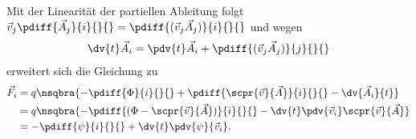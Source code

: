 \documentclass[../main.tex]{subfiles}
\begin{document}
			Mit der Linearität der partiellen Ableitung folgt $\vec v_j\pdiff{\vec{A}_j}{i}{}{}=\pdiff{(\vec v_j\vec{A}_j)}{i}{}{}$ und wegen 
			\begin{align*}
				\dv{t}\vec{A}_i=\pdv{t}\vec A_i+\pdiff{(\vec v_j\vec A_j)}{j}{}{}
			\end{align*} 
			erweitert sich die Gleichung zu 
			\begin{align*}
				\vec{F}_i&=q\nsqbra{-\pdiff{\Phi}{i}{}{}+\pdiff{\scpr{\vec v}{\vec A}}{i}{}{}-\dv{\vec{A}_i}{t}} \\
				&=q\nsqbra{-\pdiff{(\Phi-\scpr{\vec v}{\vec A})}{i}{}{}-\dv{t}\pdv{\vec{v}_i}\scpr{\vec v}{\vec A}} \\
				&=-\pdiff{\psi}{i}{}{}+\dv{t}\pdv{\psi}{\vec{v}_i}. 
			\end{align*}
			
\end{document}

